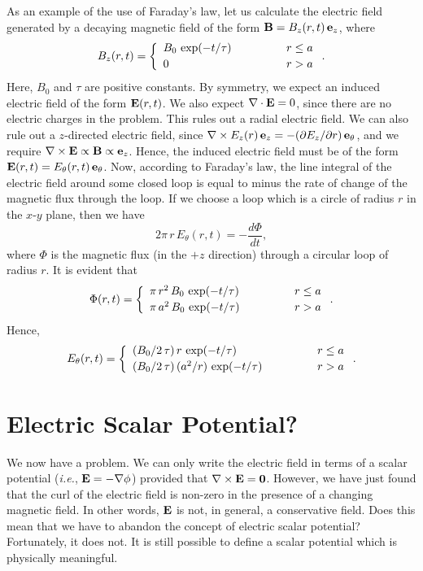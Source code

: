 As an example of the use of Faraday's law, let us calculate the electric
field generated by a decaying magnetic field of the form ${\bf B} = B_z(r,t)\,{\bf e}_z$, where
\begin{equation}
B_z(r,t) = \left\{
\begin{array}{lcc}
B_0\,\exp(-t/\tau)&\mbox{\hspace{1cm}}&r\leq a\\[0.5ex]
0&&r>a
\end{array}
\right..
\end{equation}
Here, $B_0$ and $\tau$ are positive constants.
By symmetry, we expect an induced electric field of the form ${\bf E}(r,t)$.
We also expect $\nabla\cdot{\bf E}=0$, since there are no electric charges
in the problem. This rules out a radial electric field. We can also rule
out a $z$-directed electric field, since $\nabla\times E_z(r)\,{\bf e}_z = -(\partial E_z/\partial r)\,{\bf e}_\theta$, and we require $\nabla\times {\bf E} \propto {\bf B}\propto {\bf e}_z$. Hence, the induced electric field must be of the
form ${\bf E}(r,t) = E_\theta(r,t)\,{\bf e}_\theta$. Now, according to
Faraday's law, the line integral of the electric field around some closed
loop is equal to minus the rate of change of the magnetic flux through
the loop. If we choose a loop which is a circle of radius $r$ in the $x$-$y$ plane, then we have
\begin{equation}
2\pi\,r\,E_\theta(r,t) = - \frac{d\Phi}{dt},
\end{equation}
where $\Phi$ is the magnetic flux (in the $+z$ direction) through a circular loop of radius $r$. 
It is evident that
\begin{equation}
\Phi(r,t) = \left\{
\begin{array}{lcc}
\pi\,r^2\,B_0\,\exp(-t/\tau)&\mbox{\hspace{1cm}}&r\leq a\\[0.5ex]
\pi\,a^2\,B_0\,\exp(-t/\tau)&&r>a
\end{array}
\right..
\end{equation}
Hence,
\begin{equation}
E_\theta(r,t) = \left\{
\begin{array}{lcc}
(B_0/2\,\tau)\,r\,\exp(-t/\tau)&\mbox{\hspace{1cm}}&r\leq a\\[0.5ex]
(B_0/2\,\tau)\,(a^2/r)\,\exp(-t/\tau)&&r>a
\end{array}
\right..
\end{equation}

\section{Electric Scalar Potential?}\label{s4.3}
We now have a problem. We can only write the electric field  in terms of a
scalar potential ({\em i.e.}, ${\bf E} = - \nabla\phi$) provided that
$\nabla\times{\bf E} = {\bf 0}$. However, we have just found that  the curl of the electric field is non-zero in the presence of a changing magnetic field.
In other words, ${\bf E}$ is not, in general, a conservative field. Does this
mean that we have to abandon the concept of electric scalar potential?
Fortunately, it does not. It is still possible to define a scalar potential which is
physically meaningful. 

